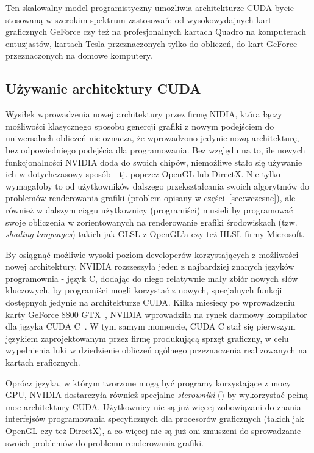 Ten skalowalny model programistyczny umożliwia architekturze CUDA bycie stosowaną w szerokim spektrum zastosowań: od wysokowydajnych kart graficznych GeForce czy też na profesjonalnych kartach Quadro na komputerach entuzjastów, kartach Tesla przeznaczonych tylko do obliczeń, do kart GeForce przeznaczonych na domowe komputery.

\subsection{Używanie architektury CUDA}

Wysiłek wprowadzenia nowej architektury przez firmę NIDIA, która łączy możliwości klasycznego sposobu genercji grafiki z nowym podejściem do uniwersalnch obliczeń nie oznacza, że wprowadzono jedynie nową architekturę, bez odpowiedniego podejścia dla programowania. Bez względu na to, ile nowych funkcjonalności NVIDIA doda do swoich chipów, niemożliwe stało się używanie ich w dotychczasowy sposób - tj. poprzez OpenGL lub DirectX. Nie tylko wymagałoby to od użytkowników dalszego przekształcania swoich algorytmów do problemów renderowania grafiki (problem opisany w części~\ref{sec:wczesne}), ale również w dalszym ciągu użytkownicy (programiści) musieli by programować swoje obliczenia w zorientowanych na renderowanie grafiki środowiskach (tzw. \emph{shading languages}) takich jak GLSL z OpenGL'a czy też HLSL firmy Microsoft.

By osiągnąć możliwie wysoki poziom developerów korzystających z możliwości nowej architektury, NVIDIA rozszeszyła jeden z najbardziej znanych języków programownia - język C, dodając do niego relatywnie mały zbiór nowych słów kluczowych, by programiści mogli korzystać z nowych, specjalnych funkcji dostępnych jedynie na architekturze CUDA. Kilka miesiecy po wprowadzeniu karty GeForce 8800 GTX~\cite{nvidia:geforce8800}, NVIDIA wprowadziła na rynek darmowy kompilator dla języka CUDA C~\cite{cuda:downloads}. W tym samym momencie, CUDA C stał się pierwszym językiem zaprojektowanym przez firmę produkującą sprzęt graficzny, w celu wypełnienia luki w dziedzienie obliczeń ogólnego przeznaczenia realizowanych na kartach graficznych.

Oprócz języka, w którym tworzone mogą być programy korzystające z mocy GPU, NVIDIA dostarczyła również specjalne \emph{sterowniki} () by wykorzystać pełną moc architektury CUDA. Użytkownicy nie są już więcej zobowiązani do znania interfejsów programowania specyficznych dla procesorów graficznych (takich jak OpenGL czy też DirectX), a co więcej nie są już oni zmuszeni do sprowadzanie swoich problemów do problemu renderowania grafiki.

